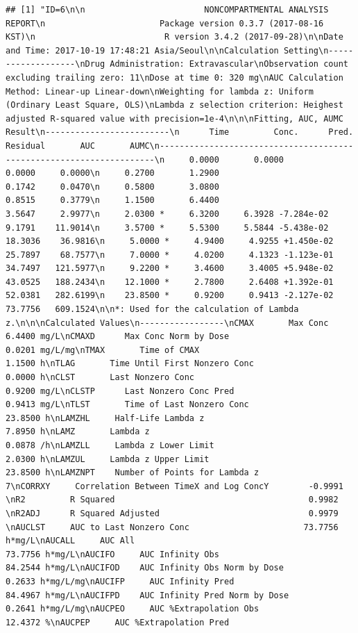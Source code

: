 \documentclass[]{krantz}
\theoremstyle{definition}
\theoremstyle{definition}
\theoremstyle{definition}
\theoremstyle{remark}
\begin{document}
\begin{verbatim}
## [1] "ID=6\n\n                        NONCOMPARTMENTAL ANALYSIS REPORT\n                       Package version 0.3.7 (2017-08-16 KST)\n                          R version 3.4.2 (2017-09-28)\n\nDate and Time: 2017-10-19 17:48:21 Asia/Seoul\n\nCalculation Setting\n-------------------\nDrug Administration: Extravascular\nObservation count excluding trailing zero: 11\nDose at time 0: 320 mg\nAUC Calculation Method: Linear-up Linear-down\nWeighting for lambda z: Uniform (Ordinary Least Square, OLS)\nLambda z selection criterion: Heighest adjusted R-squared value with precision=1e-4\n\n\nFitting, AUC, AUMC Result\n-------------------------\n      Time         Conc.      Pred.   Residual       AUC       AUMC\n---------------------------------------------------------------------\n     0.0000       0.0000                           0.0000     0.0000\n     0.2700       1.2900                           0.1742     0.0470\n     0.5800       3.0800                           0.8515     0.3779\n     1.1500       6.4400                           3.5647     2.9977\n     2.0300 *     6.3200     6.3928 -7.284e-02     9.1791    11.9014\n     3.5700 *     5.5300     5.5844 -5.438e-02    18.3036    36.9816\n     5.0000 *     4.9400     4.9255 +1.450e-02    25.7897    68.7577\n     7.0000 *     4.0200     4.1323 -1.123e-01    34.7497   121.5977\n     9.2200 *     3.4600     3.4005 +5.948e-02    43.0525   188.2434\n    12.1000 *     2.7800     2.6408 +1.392e-01    52.0381   282.6199\n    23.8500 *     0.9200     0.9413 -2.127e-02    73.7756   609.1524\n\n*: Used for the calculation of Lambda z.\n\n\nCalculated Values\n-----------------\nCMAX       Max Conc                                        6.4400 mg/L\nCMAXD      Max Conc Norm by Dose                           0.0201 mg/L/mg\nTMAX       Time of CMAX                                    1.1500 h\nTLAG       Time Until First Nonzero Conc                   0.0000 h\nCLST       Last Nonzero Conc                               0.9200 mg/L\nCLSTP      Last Nonzero Conc Pred                          0.9413 mg/L\nTLST       Time of Last Nonzero Conc                      23.8500 h\nLAMZHL     Half-Life Lambda z                              7.8950 h\nLAMZ       Lambda z                                        0.0878 /h\nLAMZLL     Lambda z Lower Limit                            2.0300 h\nLAMZUL     Lambda z Upper Limit                           23.8500 h\nLAMZNPT    Number of Points for Lambda z                   7\nCORRXY     Correlation Between TimeX and Log ConcY        -0.9991 \nR2         R Squared                                       0.9982 \nR2ADJ      R Squared Adjusted                              0.9979 \nAUCLST     AUC to Last Nonzero Conc                       73.7756 h*mg/L\nAUCALL     AUC All                                        73.7756 h*mg/L\nAUCIFO     AUC Infinity Obs                               84.2544 h*mg/L\nAUCIFOD    AUC Infinity Obs Norm by Dose                   0.2633 h*mg/L/mg\nAUCIFP     AUC Infinity Pred                              84.4967 h*mg/L\nAUCIFPD    AUC Infinity Pred Norm by Dose                  0.2641 h*mg/L/mg\nAUCPEO     AUC %Extrapolation Obs                         12.4372 %\nAUCPEP     AUC %Extrapolation Pred                    
\end{verbatim}
\end{document}
